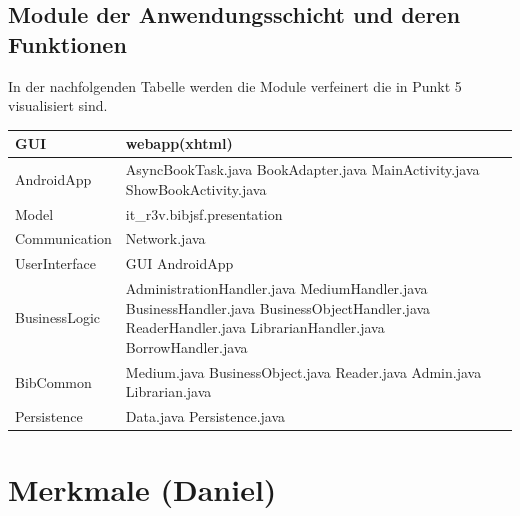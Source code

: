 \documentclass[fontsize=12pt,paper=a4,twoside]{scrartcl}
\begin{document}
\subsection{Module der Anwendungsschicht und deren Funktionen}
\label{mod-controller}

In der nachfolgenden Tabelle werden die Module verfeinert die in Punkt 5 visualisiert sind.

\begin{tabular}{|l|p{12cm}|}
\hline
	GUI & webapp(xhtml)\\
\hline
	AndroidApp & AsyncBookTask.java BookAdapter.java MainActivity.java  ShowBookActivity.java\\
\hline
	Model & it\_r3v.bibjsf.presentation\\
\hline
	Communication & Network.java\\
\hline
	UserInterface & GUI AndroidApp\\
\hline
	BusinessLogic & AdministrationHandler.java MediumHandler.java BusinessHandler.java BusinessObjectHandler.java ReaderHandler.java LibrarianHandler.java BorrowHandler.java\\
\hline
	BibCommon & Medium.java BusinessObject.java Reader.java Admin.java Librarian.java\\
\hline
	Persistence & Data.java Persistence.java\\
\hline
\end{tabular}


\clearpage

\section{Merkmale (Daniel)}
\label{c04}
\end{document}
